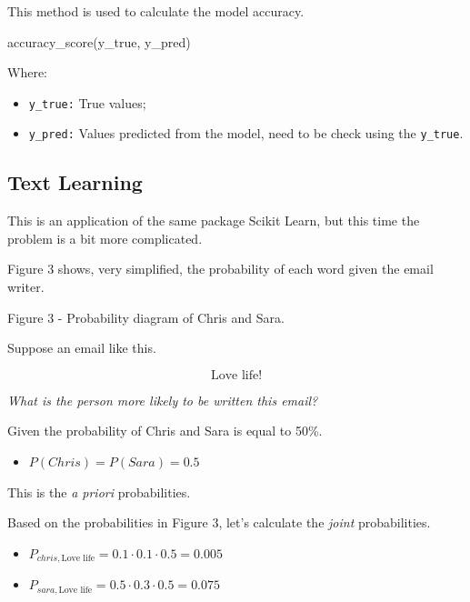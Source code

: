 \documentclass[]{book}
\newenvironment{Shaded}{\begin{snugshade}}{\end{snugshade}}
\newcommand{\NormalTok}[1]{#1}
\providecommand{\tightlist}{%
  \setlength{\itemsep}{0pt}\setlength{\parskip}{0pt}}
\begin{document}
This method is used to calculate the model accuracy.

\begin{Shaded}
\begin{Highlighting}[]
\NormalTok{accuracy_score(y_true, y_pred)}
\end{Highlighting}
\end{Shaded}

Where:

\begin{itemize}
\tightlist
\item
  \texttt{y\_true:} True values;
\item
  \texttt{y\_pred:} Values predicted from the model, need to be check
  using the \texttt{y\_true}.
\end{itemize}

\subsection{Text Learning}\label{text-learning}

This is an application of the same package Scikit Learn, but this time
the problem is a bit more complicated.

Figure 3 shows, very simplified, the probability of each word given the
email writer.

Figure 3 - Probability diagram of Chris and Sara.

Suppose an email like this.

\[\text{Love life!} \tag{1}\]

\emph{What is the person more likely to be written this email?}

Given the probability of Chris and Sara is equal to 50\%.

\begin{itemize}
\tightlist
\item
  \(P(Chris) = P(Sara) = 0.5\)
\end{itemize}

This is the \emph{a priori} probabilities.

Based on the probabilities in Figure 3, let's calculate the \emph{joint}
probabilities.

\begin{itemize}
\tightlist
\item
  \(P_{chris,\text{Love life}} = 0.1 \cdot 0.1 \cdot 0.5 = 0.005\)
\item
  \(P_{sara,\text{Love life}} = 0.5 \cdot 0.3 \cdot 0.5 = 0.075\)
\end{itemize}
\end{document}
